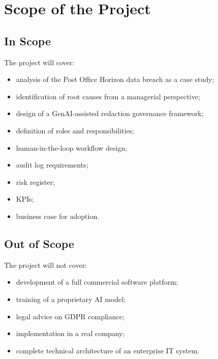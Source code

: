 \documentclass[12pt,a4paper]{article}
\begin{document}
\section{Scope of the Project}

\subsection{In Scope}

\begin{definitionbox}[In Scope]
The project will cover:
\begin{itemize}
    \item analysis of the Post Office Horizon data breach as a case study;
    \item identification of root causes from a managerial perspective;
    \item design of a GenAI-assisted redaction governance framework;
    \item definition of roles and responsibilities;
    \item human-in-the-loop workflow design;
    \item audit log requirements;
    \item risk register;
    \item KPIs;
    \item business case for adoption.
\end{itemize}
\end{definitionbox}

\subsection{Out of Scope}

\begin{tcolorbox}[
  enhanced, breakable,
  colback=gray!6,
  colframe=gray!40,
  boxrule=0.8pt,
  arc=2pt,
  left=8pt, right=8pt, top=6pt, bottom=6pt,
  title={\bfseries Out of Scope},
  coltitle=gray!60!black,
  attach boxed title to top left={yshift=-2mm, xshift=6mm},
  boxed title style={colback=gray!15, arc=2pt, boxrule=0.6pt, colframe=gray!40},
]
The project will not cover:
\begin{itemize}
    \item development of a full commercial software platform;
    \item training of a proprietary AI model;
    \item legal advice on GDPR compliance;
    \item implementation in a real company;
    \item complete technical architecture of an enterprise IT system.
\end{itemize}
\end{tcolorbox}
\end{document}
